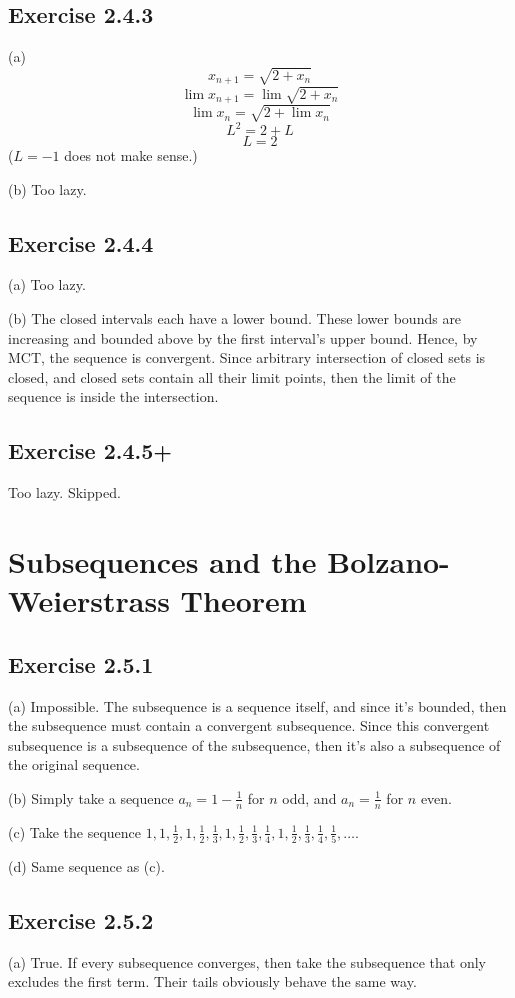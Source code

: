 \documentclass{book}
\begin{document}
\subsection*{Exercise 2.4.3}
(a)
$$x_{n + 1} = \sqrt{2 + x_n}$$
$$\lim x_{n + 1} = \lim \sqrt{2 + x_n}$$
$$\lim x_n = \sqrt{2 + \lim x_n}$$
$$L^2 = 2 + L$$
$$L = 2$$
($L = -1$ does not make sense.)

\noindent
(b)
Too lazy.

\subsection*{Exercise 2.4.4}
(a)
Too lazy.

\noindent
(b)
The closed intervals each have a lower bound. These lower bounds are increasing and bounded above by the first interval's upper bound. Hence, by MCT, the sequence is convergent. Since arbitrary intersection of closed sets is closed, and closed sets contain all their limit points, then the limit of the sequence is inside the intersection.

\subsection*{Exercise 2.4.5+}
Too lazy. Skipped.

\section{Subsequences and the Bolzano-Weierstrass Theorem}

\subsection*{Exercise 2.5.1}
(a)
Impossible. The subsequence is a sequence itself, and since it's bounded, then the subsequence must contain a convergent subsequence. Since this convergent subsequence is a subsequence of the subsequence, then it's also a subsequence of the original sequence.

\noindent
(b)
Simply take a sequence $a_n = 1 - \frac{1}{n}$ for $n$ odd, and $a_n = \frac{1}{n}$ for $n$ even.

\noindent
(c)
Take the sequence $1, 1, \frac{1}{2}, 1, \frac{1}{2}, \frac{1}{3}, 1, \frac{1}{2}, \frac{1}{3}, \frac{1}{4}, 1, \frac{1}{2}, \frac{1}{3}, \frac{1}{4}, \frac{1}{5}, \ldots$.

\noindent
(d)
Same sequence as (c).

\subsection*{Exercise 2.5.2}
(a)
True. If every subsequence converges, then take the subsequence that only excludes the first term. Their tails obviously behave the same way.
\end{document}
